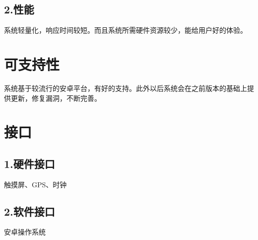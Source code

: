 \documentclass [a4paper,11pt]{article}
\begin{document}
\subsection*{2.性能}
系统轻量化，响应时间较短。而且系统所需硬件资源较少，能给用户好的体验。
\section*{可支持性}
系统基于较流行的安卓平台，有好的支持。此外以后系统会在之前版本的基础上提供更新，修复漏洞，不断完善。

\section*{接口}
\subsection*{1.硬件接口}
触摸屏、GPS、时钟
\subsection*{2.软件接口}
安卓操作系统
  
\end{document}

